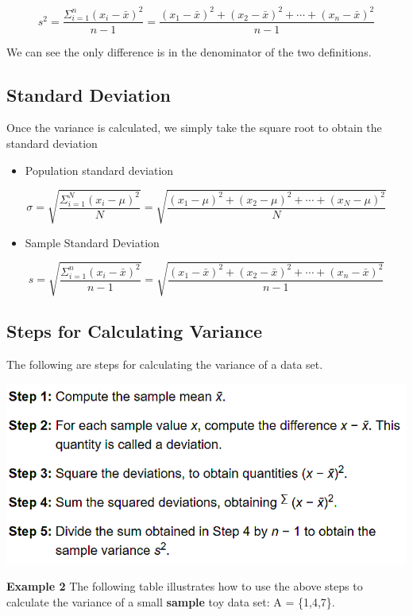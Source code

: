 \documentclass[
]{book}
\providecommand{\tightlist}{%
  \setlength{\itemsep}{0pt}\setlength{\parskip}{0pt}}
\begin{document}
\[
s^2 = \frac{\Sigma_{i=1}^n (x_i-\bar{x})^2}{n-1}=\frac{(x_1-\bar{x})^2 + (x_2-\bar{x})^2+\cdots+(x_n-\bar{x})^2}{n-1}
\]

We can see the only difference is in the denominator of the two definitions.

\hypertarget{standard-deviation}{%
\subsection{Standard Deviation}\label{standard-deviation}}

Once the variance is calculated, we simply take the square root to obtain the standard deviation

\begin{itemize}
\tightlist
\item
  Population standard deviation
\end{itemize}

\[
\sigma = \sqrt{\frac{\Sigma_{i=1}^N (x_i-\mu)^2}{N}} = \sqrt{\frac{(x_1-\mu)^2 + (x_2-\mu)^2+\cdots+(x_N-\mu)^2}{N}}
\]

\begin{itemize}
\tightlist
\item
  Sample Standard Deviation
\end{itemize}

\[
s = \sqrt{\frac{\Sigma_{i=1}^n (x_i-\bar{x})^2}{n-1}}=\sqrt{\frac{(x_1-\bar{x})^2 + (x_2-\bar{x})^2+\cdots+(x_n-\bar{x})^2}{n-1}}
\]

\hypertarget{steps-for-calculating-variance}{%
\subsection{Steps for Calculating Variance}\label{steps-for-calculating-variance}}

The following are steps for calculating the variance of a data set.

\begin{center}\includegraphics[width=0.65\linewidth]{week02/calcVariance} \end{center}

\textbf{Example 2} The following table illustrates how to use the above steps to calculate the variance of a small \textbf{sample} toy data set: A = \{1,4,7\}.
\end{document}
